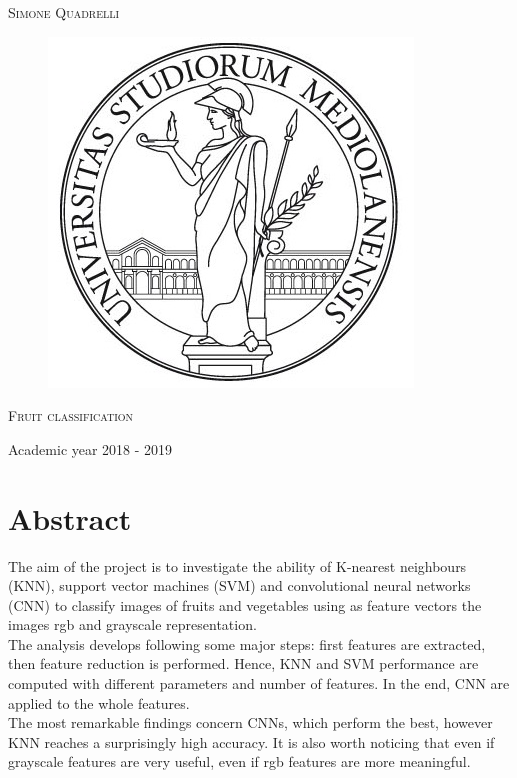 \documentclass{article}
\begin{document}
\begin{titlepage}
	
	
	\begin{center}
		\vspace{2 cm}
		{\Large \textsc{Simone Quadrelli} }
	\end{center}
	
	
	\begin{figure}[H]
		\vspace{2 cm}
		\centering
		\includegraphics[width=0.30\linewidth]{tesiSCIENZE_TECNOLOGIE.jpg}
		
	\end{figure}
	
	\begin{center}
		\vspace{2 cm}
		{\Large \textsc{Fruit classification} }
	\end{center}

	\par
	\vspace{3 cm}
	
	\begin{center}
		{\large Academic year 2018 - 2019}
	\end{center}
\end{titlepage}

\newpage 
{}
\tableofcontents
\listoftables
\listoffigures
\newpage


\section*{Abstract}
The aim of the project is to investigate the ability of K-nearest neighbours (KNN), support vector machines (SVM) and convolutional neural networks (CNN) to classify images of fruits and vegetables using as feature vectors the images rgb and grayscale representation.\\
The analysis develops following some major steps: first features are extracted, then feature reduction is performed. Hence, KNN and SVM performance are computed with different parameters and number of features. In the end, CNN are applied to the whole features. \\
The most remarkable findings concern CNNs, which perform the best, however KNN reaches a surprisingly high accuracy. It is also worth noticing that  even if grayscale features are very useful, even if rgb features are more meaningful.
\end{document}

